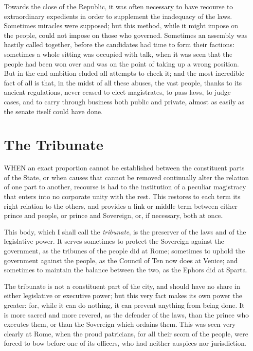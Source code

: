 \documentclass[12pt]{report}
\begin{document}
Towards the close of the Republic, it was often necessary to have recourse to extraordinary expedients in order to supplement the inadequacy of the laws. Sometimes miracles were supposed; but this method, while it might impose on the people, could not impose on those who governed. Sometimes an assembly was hastily called together, before the candidates had time to form their factions: sometimes a whole sitting was occupied with talk, when it was seen that the people had been won over and was on the point of taking up a wrong position. But in the end ambition eluded all attempts to check it; and the most incredible fact of all is that, in the midst of all these abuses, the vast people, thanks to its ancient regulations, never ceased to elect magistrates, to pass laws, to judge cases, and to carry through business both public and private, almost as easily as the senate itself could have done.

\section{The Tribunate}
WHEN an exact proportion cannot be established between the constituent parts of the State, or when causes that cannot be removed continually alter the relation of one part to another, recourse is had to the institution of a peculiar magistracy that enters into no corporate unity with the rest. This restores to each term its right relation to the others, and provides a link or middle term between either prince and people, or prince and Sovereign, or, if necessary, both at once.

This body, which I shall call the \textit{tribunate}, is the preserver of the laws and of the legislative power. It serves sometimes to protect the Sovereign against the government, as the tribunes of the people did at Rome; sometimes to uphold the government against the people, as the Council of Ten now does at Venice; and sometimes to maintain the balance between the two, as the Ephors did at Sparta.

The tribunate is not a constituent part of the city, and should have no share in either legislative or executive power; but this very fact makes its own power the greater: for, while it can do nothing, it can prevent anything from being done. It is more sacred and more revered, as the defender of the laws, than the prince who executes them, or than the Sovereign which ordains them. This was seen very clearly at Rome, when the proud patricians, for all their scorn of the people, were forced to bow before one of its officers, who had neither auspices nor jurisdiction.
\end{document}
